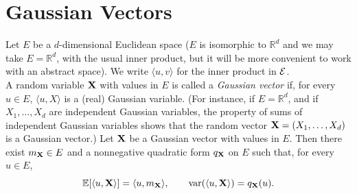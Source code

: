 \documentclass[../Main.tex]{subfiles}
\begin{document}
\section{Gaussian Vectors}
Let $E$ be a $d$-dimensional Euclidean space ($E$ is isomorphic to $\mathbb R^d$ and we may take $E=\mathbb R^d$, with the usual inner product, but it will be more convenient to work with an abstract space). We write $\langle u,v\rangle$ for the inner product in $\mathcal{E}$.\\
A random variable $\mathbf{X}$ with values in $E$ is called a \emph{Gaussian vector} if, for every $u\in E$, $\langle u,X\rangle$ is a (real) Gaussian variable. (For instance, if $E=\mathbb R^d$, and if $X_1,\dots,X_d$ are independent Gaussian variables, the property of sums of independent Gaussian variables shows that the random vector $\mathbf{X}=(X_1,\dots,X_d)$ is a Gaussian vector.)
\vspace{1cm}
Let $\mathbf{X}$ be a Gaussian vector with values in $E$. Then there exist $m_{\mathbf{X}}\in E$ and a nonnegative quadratic form $q_{\mathbf{X}}$ on $E$ such that, for every $u\in E$,
\[ \mathbb{E}[\langle u,\mathbf{X}\rangle] = \langle u, m_{\mathbf{X}}\rangle, \qquad \mathrm{var}(\langle u,\mathbf{X}\rangle) = q_{\mathbf{X}}(u). \]
\end{document}
